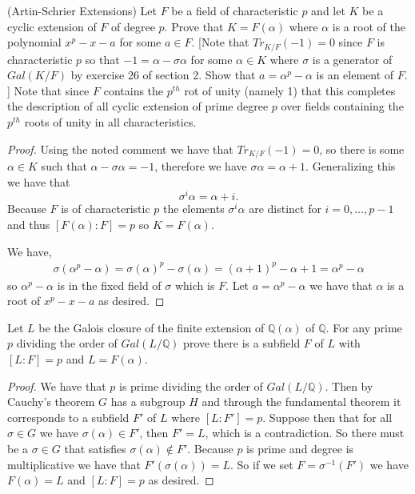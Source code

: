 \documentclass[11pt]{article}
\newenvironment{problem}[2][Problem\!]{\begin{tcolorbox}\begin{trivlist}
\item[\hskip \labelsep {\bfseries #1}\hskip \labelsep {\bfseries #2}]}{\end{trivlist}\end{tcolorbox}}
\newcommand{\qq}{\mathbb Q}   %
\begin{document}
\begin{problem} {14.7.9}
    (Artin-Schrier Extensions) Let $F$ be a field of characteristic $p$ and let $K$ be a cyclic extension of $F$ of degree $p$. Prove that $K = F(\alpha)$ where $\alpha$ is a root of the polynomial $x^{p} - x - a$ for some $a \in F$. [Note that $Tr_{K/F}(-1) = 0$ since $F$ is characteristic $p$ so that $-1 = \alpha -\sigma \alpha$ for some $\alpha \in K $ where $\sigma$ is a generator of $Gal(K/F)$ by exercise 26 of section 2. Show that $a = \alpha^{p} - \alpha$ is an element of $F.$] Note that since $F$ contains the $p^{th}$ rot of unity (namely 1) that this completes the description of all cyclic extension of prime degree $p$ over fields containing the $p^{th}$ roots of unity in all characteristics. 
\end{problem}
\begin{proof}
    Using the noted comment we have that $Tr_{K/F}(-1) = 0$, so there is some $\alpha \in K$ such that $\alpha - \sigma\alpha = -1$, therefore we have $\sigma\alpha = \alpha + 1$. Generalizing this we have that 
    \[\sigma^{i}\alpha = \alpha + i.\]
    Because $F$ is of characteristic $p$ the elements $\sigma^{i}\alpha$ are distinct for $i = 0, \dots, p-1$ and thus $[F(\alpha): F] = p$ so $K = F(\alpha)$. 

    We have,
    \begin{align*}
        \sigma(\alpha^{p}- \alpha) = \sigma(\alpha)^{p} -\sigma(\alpha) = (\alpha+1)^{p} -\alpha + 1 = \alpha^{p} - \alpha
    \end{align*}
    so $\alpha^{p}-\alpha$ is in the fixed field of $\sigma$ which is $F$. Let $a  = \alpha^{p} - \alpha$ we have that $\alpha$ is a root of $x^{p} -x - a $ as desired. 
\end{proof}

\vspace*{15pt}

\begin{problem} {14.7.12}
    Let $L$ be the Galois closure of the finite extension of $\qq(\alpha)$ of $\qq$. For any prime $p$ dividing the order of $Gal(L/\qq)$ prove there is a subfield $F$ of $L$ with $[L:F] = p$ and $L = F(\alpha)$.
\end{problem}
\begin{proof}
    We have that $p$ is prime dividing the order of $Gal(L/\qq)$. Then by Cauchy's theorem $G$ has a subgroup $H$ and through the fundamental theorem it corresponds to a subfield $F'$ of $L$ where $[L: F'] = p$. Suppose then that for all $\sigma \in G$ we have $\sigma(\alpha)\in F'$, then $F' = L$, which is a contradiction. So there must be a $\sigma \in G$ that satisfies $\sigma(\alpha)\notin F'$. Because $p$ is prime and degree is multiplicative we have that $F'(\sigma(\alpha)) = L$. So if we set $F = \sigma^{-1}(F')$ we have $F(\alpha) = L$ and $[L:F] = p$ as desired.
\end{proof}
\end{document}
